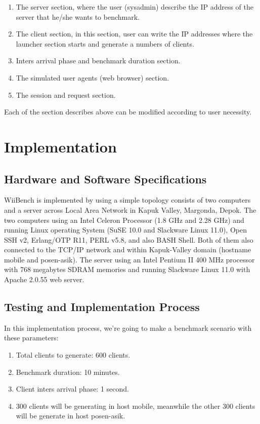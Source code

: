 \documentclass[final,
notitlepage,
narroweqnarray,
    inline,
    twoside,
]{ieee}
\begin{document}
\begin{enumerate}
\item The server section, where the user (sysadmin) describe the
IP address of the server that he/she wants to benchmark.

\item The client section, in this section, user can write the IP
addresses where the launcher section starts and generate a numbers
of clients.

\item Inters arrival phase and benchmark duration section.

\item The simulated user agents (web browser) section.

\item The session and request section.
\end{enumerate}

Each of the section describes above can be modified according to user necessity.

\section{Implementation}

\subsection{Hardware and Software Specifications}


WiiBench is implemented by using a simple topology consists of two
computers and a server across Local Area Network in Kapuk Valley,
Margonda, Depok. The two computers using an Intel Celeron
Processor (1.8 GHz and 2.28 GHz) and running Linux operating
System (SuSE 10.0 and Slackware Linux 11.0), Open SSH v2,
Erlang/OTP R11, PERL v5.8, and also BASH Shell. Both of them also
connected to the TCP/IP network and within Kapuk-Valley domain
(hostname mobile and posen-asik). The server using an Intel
Pentium II 400 MHz processor with 768 megabytes SDRAM memories and
running Slackware Linux 11.0 with Apache 2.0.55 web server.

\subsection{Testing and Implementation Process}

In this implementation process, we're going to make a benchmark scenario with these parameters:

\begin{enumerate}
\item Total clients to generate: 600 clients.

\item Benchmark duration: 10 minutes.

\item Client inters arrival phase: 1 second.

\item 300 clients will be generating in host mobile, meanwhile the
other 300 clients will be generate in host posen-asik.
\end{enumerate}
\end{document}
